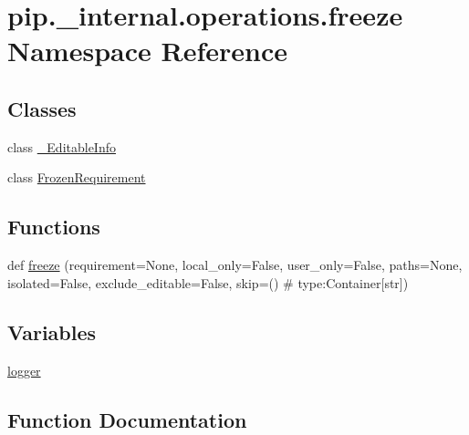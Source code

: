 \hypertarget{namespacepip_1_1__internal_1_1operations_1_1freeze}{}\section{pip.\+\_\+internal.\+operations.\+freeze Namespace Reference}
\label{namespacepip_1_1__internal_1_1operations_1_1freeze}
\subsection*{Classes}
\begin{DoxyCompactItemize}
\item 
class \hyperlink{classpip_1_1__internal_1_1operations_1_1freeze_1_1__EditableInfo}{\+\_\+\+Editable\+Info}
\item 
class \hyperlink{classpip_1_1__internal_1_1operations_1_1freeze_1_1FrozenRequirement}{Frozen\+Requirement}
\end{DoxyCompactItemize}
\subsection*{Functions}
\begin{DoxyCompactItemize}
\item 
def \hyperlink{namespacepip_1_1__internal_1_1operations_1_1freeze_a4a3af3d5ae1df106da437253f7bde47d}{freeze} (requirement=None, local\+\_\+only=False, user\+\_\+only=False, paths=None, isolated=False, exclude\+\_\+editable=False, skip=() \# type\+:\+Container\mbox{[}str\mbox{]})
\end{DoxyCompactItemize}
\subsection*{Variables}
\begin{DoxyCompactItemize}
\item 
\hyperlink{namespacepip_1_1__internal_1_1operations_1_1freeze_a9af16aabecbcae08546946f45c00e541}{logger}
\end{DoxyCompactItemize}


\subsection{Function Documentation}
\mbox{\label{namespacepip_1_1__internal_1_1operations_1_1freeze_a4a3af3d5ae1df106da437253f7bde47d}} 
